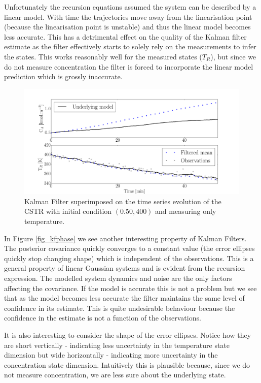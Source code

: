 \documentclass[../masters.tex]{subfiles}
\begin{document}
Unfortunately the recursion equations assumed the system can be described by a linear model. With time the trajectories move away from the linearisation point (because the linearisation point is unstable) and thus the linear model becomes less accurate. This has a detrimental effect on the quality of the Kalman filter estimate as the filter effectively starts to solely rely on the measurements to infer the states. This works reasonably well for the measured states ($T_R$), but since we do not measure concentration the filter is forced to incorporate the linear model prediction which is grossly inaccurate. 
\begin{figure}[H] 
\centering
\includegraphics[scale=0.30]{kalman_filter_timeseries_M1.pdf}
\caption{Kalman Filter superimposed on the time series evolution of the CSTR with initial condition $(0.50, 400)$ and measuring only temperature.}
\label{fig_kftimeseries}
\end{figure}
In Figure \ref{fig_kfphase} we see another interesting property of Kalman Filters. The posterior covariance quickly converges to a constant value (the error ellipses quickly stop changing shape) which is independent of the observations. This is a general property of linear Gaussian systems \cite{barber} and is evident from the recursion expression. The modelled system dynamics and noise are the only factors affecting the covariance. If the model is accurate this is not a problem but we see that as the model becomes less accurate the filter maintains the same level of confidence in its estimate. This is quite undesirable behaviour because the confidence in the estimate is not a function of the observations. 

It is also interesting to consider the shape of the error ellipses. Notice how they are short vertically - indicating less uncertainty in the temperature state dimension but wide horizontally - indicating more uncertainty in the concentration state dimension. Intuitively this is plausible because, since we do not measure concentration, we are less sure about the underlying state. 
\end{document}
